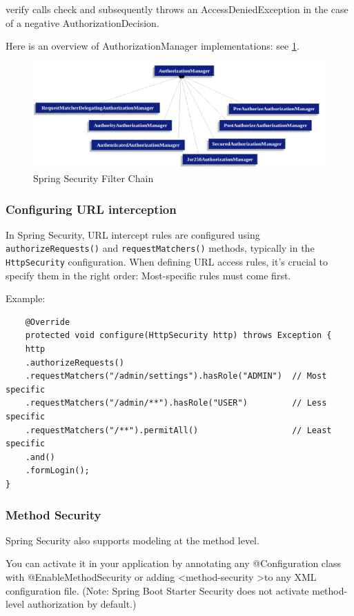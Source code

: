 \documentclass{scrartcl}
\begin{document}
verify calls check and subsequently throws an AccessDeniedException in the case of a negative AuthorizationDecision.

Here is an overview of AuthorizationManager implementations: see \ref{fig:auth-manag-impl}.

\begin{figure}
    \centering
    \includegraphics[width=1\linewidth]{auth-manag-impl}
    \caption{Spring Security Filter Chain}
    \label{fig:auth-manag-impl}
\end{figure}

\subsubsection{Configuring URL interception}

In Spring Security, URL intercept rules are configured using \lstinline|authorizeRequests()| and \lstinline|requestMatchers()| methods, typically in the \lstinline|HttpSecurity| configuration. When defining URL access rules, it's crucial to specify them in the right order: Most-specific rules must come first.

Example:

\begin{lstlisting}
    @Override
    protected void configure(HttpSecurity http) throws Exception {
    http
    .authorizeRequests()
    .requestMatchers("/admin/settings").hasRole("ADMIN")  // Most specific
    .requestMatchers("/admin/**").hasRole("USER")         // Less specific
    .requestMatchers("/**").permitAll()                   // Least specific
    .and()
    .formLogin();
}
\end{lstlisting}


\subsubsection{Method Security}

Spring Security also supports modeling at the method level.

You can activate it in your application by annotating any @Configuration class with @EnableMethodSecurity or adding \textless method-security \textgreater  to any XML configuration file. (Note: Spring Boot Starter Security does not activate method-level authorization by default.)
\end{document}

